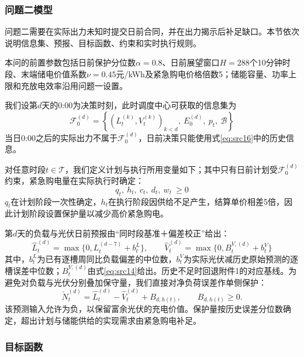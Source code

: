 \subsubsection{问题二模型}

问题二需要在实际出力未知时提交日前合同，并在出力揭示后补足缺口。本节依次说明信息集、预报、目标函数、约束和实时执行规则。

本问的前置参数包括日前保护分位数$\alpha=0.8$、日前展望窗口$H=288$个10分钟时段、末端储电价值系数$\nu=0.45$元/kWh及紧急购电价格倍数5；储能容量、功率上限和充放电效率沿用问题一设置。


我们设第$d$天的0:00为决策时刻，此时调度中心可获取的信息集为
\begin{equation}\label{eq:src16}
    \mathcal{F}_{0}^{(d)}=\left\{\left(L_{t}^{(k)},V_{t}^{(k)}\right)_{k<d},\ E_0^{(d)},\ p_t,\ \mathcal B\right\}
\end{equation}
当日0:00之后的实际出力不属于$\mathcal{F}_0^{(d)}$，日前决策只能使用式\eqref{eq:src16}中的历史信息。

对任意时段$t\in\mathcal{T}$，我们定义计划与执行所用变量如下；其中只有日前计划受$\mathcal{F}_0^{(d)}$约束，紧急购电量在实际执行时确定：
\begin{equation}\label{eq:src17}
    q_{t},\ h_{t},\ c_{t},\ d_{t},\ w_{t}\ \ge 0
\end{equation}
$q_t$在计划阶段一次性确定，$h_t$在执行阶段因供给不足产生，结算单价相差5倍，因此计划阶段设置保护量以减少高价紧急购电。


第$d$天的负载与光伏日前预报由“同时段基准＋偏差校正”给出：
\begin{equation}\label{eq:src18}
    \hat{L}_{t}^{(d)}=\max\{0,L_t^{(d-7)}+b_t^L\},\qquad\hat{V}_{t}^{(d)}=\max\{0,B_t^{V,(d)}+b_t^V\}
\end{equation}
其中，$b_t^L$为已有逐槽周同比负载偏差的中位数，$b_t^V$为实际光伏减历史原始预测的逐槽误差中位数；$B_t^{V,(d)}$由式\eqref{eq:src14}给出。历史不足时回退附件1的对应基线。为避免对负载与光伏分别叠加保守量，我们直接对净负荷误差作单侧保护：
\begin{equation}\label{eq:src19}
 \check N_t^{(d)}=\hat L_t^{(d)}-\hat V_t^{(d)}+B_{d,h(t)},\qquad B_{d,h(t)}\ge0.
\end{equation}
该预测输入允许为负，以保留富余光伏的充电价值。保护量按历史误差分位数确定，超出计划与储能供给的实现需求由紧急购电补足。

\subsubsection{目标函数}

